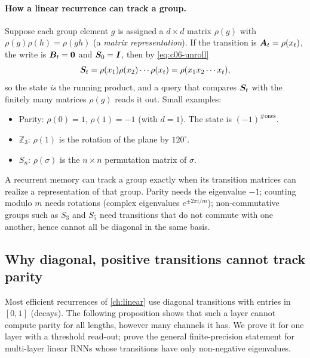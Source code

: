 \paragraph{How a linear recurrence can track a group.}
Suppose each group element $g$ is assigned a $d\times d$ matrix $\rho(g)$ with
$\rho(g)\rho(h)=\rho(gh)$ (a \emph{matrix representation}). If the transition is
$\bm{A}_t=\rho(x_t)$, the write is $\bm{B}_t=\bm 0$ and $\bm{S}_0=\bm{I}$, then by
\eqref{eq:c06-unroll}
\begin{equation}\label{eq:c06-rep}
  \bm{S}_t=\rho(x_1)\rho(x_2)\cdots\rho(x_t)=\rho(x_1x_2\cdots x_t),
\end{equation}
so the state \emph{is} the running product, and a query that compares $\bm{S}_t$ with the
finitely many matrices $\rho(g)$ reads it out. Small examples:
\begin{itemize}
\item Parity: $\rho(0)=1$, $\rho(1)=-1$ (with $d=1$). The state is $(-1)^{\#\text{ones}}$.
\item $\mathbb{Z}_3$: $\rho(1)$ is the rotation of the plane by $120^\circ$.
\item $S_n$: $\rho(\sigma)$ is the $n\times n$ permutation matrix of $\sigma$.
\end{itemize}

\begin{keyidea}
A recurrent memory can track a group exactly when its transition matrices can realize a
representation of that group. Parity needs the eigenvalue $-1$; counting modulo $m$ needs
rotations (complex eigenvalues $e^{\pm 2\pi i/m}$); non-commutative groups such as $S_3$
and $S_5$ need transitions that do not commute with one another, hence cannot all be
diagonal in the same basis.
\end{keyidea}

\subsection{Why diagonal, positive transitions cannot track parity}\label{sec:c06-parity}

Most efficient recurrences of \cref{ch:linear} use diagonal transitions with entries in
$[0,1]$ (decays). The following proposition shows that such a layer cannot compute parity
for all lengths, however many channels it has. We prove it for one layer with a threshold
read-out; \citet{c03-grazzi2025unlocking} prove the general finite-precision statement for
multi-layer linear RNNs whose transitions have only non-negative eigenvalues.

